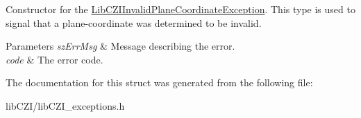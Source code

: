 Constructor for the \hyperlink{structlib_c_z_i_1_1_lib_c_z_i_invalid_plane_coordinate_exception}{Lib\+C\+Z\+I\+Invalid\+Plane\+Coordinate\+Exception}. This type is used to signal that a plane-\/coordinate was determined to be invalid. 
\begin{DoxyParams}{Parameters}
{\em sz\+Err\+Msg} & Message describing the error. \\
\hline
{\em code} & The error code. \\
\hline
\end{DoxyParams}


The documentation for this struct was generated from the following file\+:\begin{DoxyCompactItemize}
\item 
lib\+C\+Z\+I/lib\+C\+Z\+I\+\_\+exceptions.\+h\end{DoxyCompactItemize}
